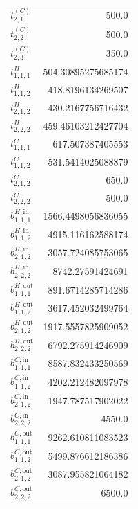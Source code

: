 \documentclass{article}%
\begin{document}
\begin{multicols*}{3}
\begin{supertabular}{lr}
	$t_{2,1}^{(C)}$ & 500.0 \\%
	$t_{2,2}^{(C)}$ & 500.0 \\%
	$t_{2,3}^{(C)}$ & 350.0 \\%
	$t_{1,1,1}^{H}$ & 504.30895275685174 \\%
	$t_{1,1,2}^{H}$ & 418.8196134269507 \\%
	$t_{2,1,2}^{H}$ & 430.2167756716432 \\%
	$t_{2,2,2}^{H}$ & 459.46103212427704 \\%
	$t_{1,1,1}^{C}$ & 617.507387405553 \\%
	$t_{1,1,2}^{C}$ & 531.5414025088879 \\%
	$t_{2,1,2}^{C}$ & 650.0 \\%
	$t_{2,2,2}^{C}$ & 500.0 \\%
	$b_{1,1,1}^{H,\text{in}}$ & 1566.4498056836055 \\%
	$b_{1,1,2}^{H,\text{in}}$ & 4915.116162588174 \\%
	$b_{2,1,2}^{H,\text{in}}$ & 3057.724085753065 \\%
	$b_{2,2,2}^{H,\text{in}}$ & 8742.27591424691 \\%
	$b_{1,1,1}^{H,\text{out}}$ & 891.6714285714286 \\%
	$b_{1,1,2}^{H,\text{out}}$ & 3617.452032499764 \\%
	$b_{2,1,2}^{H,\text{out}}$ & 1917.5557825909052 \\%
	$b_{2,2,2}^{H,\text{out}}$ & 6792.275914246909 \\%
	$b_{1,1,1}^{C,\text{in}}$ & 8587.832433250569 \\%
	$b_{1,1,2}^{C,\text{in}}$ & 4202.212482097978 \\%
	$b_{2,1,2}^{C,\text{in}}$ & 1947.787517902022 \\%
	$b_{2,2,2}^{C,\text{in}}$ & 4550.0 \\%
	$b_{1,1,1}^{C,\text{out}}$ & 9262.610811083523 \\%
	$b_{1,1,2}^{C,\text{out}}$ & 5499.876612186386 \\%
	$b_{2,1,2}^{C,\text{out}}$ & 3087.955821064182 \\%
	$b_{2,2,2}^{C,\text{out}}$ & 6500.0 \\%
\end{supertabular}%
\end{multicols*}%
\clearpage%
\end{document}
